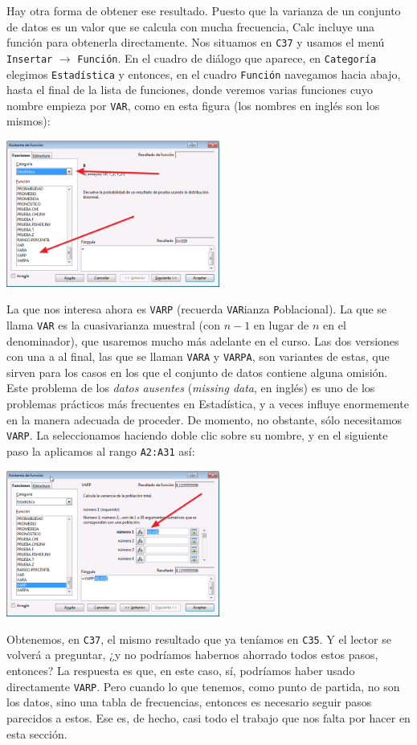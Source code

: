 \documentclass[10pt,a4paper]{article}\usepackage[]{graphicx}\usepackage[]{color}
\newcounter {cont01}
\begin{document}
Hay otra forma de obtener ese resultado. Puesto que la varianza de un conjunto de datos es un valor que se calcula con mucha frecuencia, Calc incluye una función para obtenerla directamente. Nos situamos en {\tt C37} y usamos el menú {\tt Insertar} $\to$ {\tt Función}. En el cuadro de diálogo que aparece, en {\tt Categoría} elegimos {\tt Estadística} y entonces, en el cuadro {\tt Función} navegamos hacia abajo, hasta el final de la lista de funciones, donde veremos varias funciones cuyo nombre empieza por {\tt VAR}, como en esta figura (los nombres en inglés son los mismos):
    \begin{center}
    \includegraphics[width=7cm]{../fig/Tut02-54.png}
    \end{center}
La que nos interesa ahora es {\tt VARP} (recuerda {\tt VAR}ianza {\tt P}oblacional). La que se llama {\tt VAR} es la cuasivarianza muestral (con $n-1$ en lugar de $n$ en el denominador), que usaremos mucho más adelante en el curso. Las dos versiones con una a al final, las que se llaman {\tt VARA} y {\tt VARPA}, son variantes de estas, que sirven para los casos en los que el conjunto de datos contiene alguna omisión. Este problema de los {\em datos ausentes} ({\em missing data}, en inglés) es uno de los problemas prácticos más frecuentes en Estadística, y a veces influye enormemente en la manera adecuada de proceder. De momento, no obstante, sólo necesitamos {\tt VARP}. La seleccionamos haciendo doble clic sobre su nombre, y en el siguiente paso la aplicamos al rango {\tt A2:A31} así:
    \begin{center}
    \includegraphics[width=7cm]{../fig/Tut02-55.png}
    \end{center}
Obtenemos, en {\tt C37}, el mismo resultado que ya teníamos en {\tt C35}. Y el lector se volverá a preguntar, ¿y no podríamos habernos ahorrado todos estos pasos, entonces? La respuesta es que, en este caso, sí, podríamos haber usado directamente {\tt VARP}. Pero cuando lo que tenemos, como punto de partida, no son los datos, sino una tabla de frecuencias, entonces es necesario seguir pasos parecidos a estos. Ese es, de hecho, casi todo el trabajo que nos falta por hacer en esta sección.\\
\end{document}
